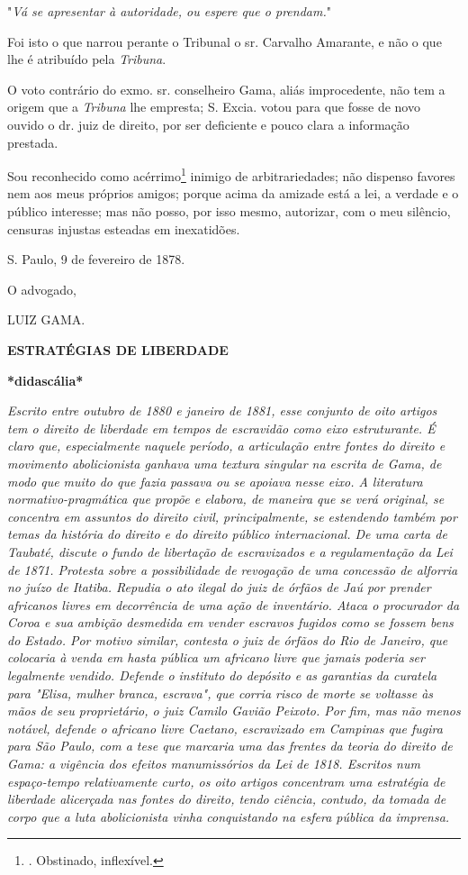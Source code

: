 "\emph{Vá se apresentar à autoridade, ou espere que o prendam.}"

Foi isto o que narrou perante o Tribunal o sr. Carvalho Amarante, e não
o que lhe é atribuído pela \emph{Tribuna}.

O voto contrário do exmo. sr. conselheiro Gama, aliás improcedente, não
tem a origem que a \emph{Tribuna} lhe empresta; S. Excia. votou para que
fosse de novo ouvido o dr. juiz de direito, por ser deficiente e pouco
clara a informação prestada.

Sou reconhecido como acérrimo\footnote{. Obstinado, inflexível.} inimigo
de arbitrariedades; não dispenso favores nem aos meus próprios amigos;
porque acima da amizade está a lei, a verdade e o público interesse; mas
não posso, por isso mesmo, autorizar, com o meu silêncio, censuras
injustas esteadas em inexatidões.

S. Paulo, 9 de fevereiro de 1878.

O advogado,

LUIZ GAMA.

\textbf{ESTRATÉGIAS DE LIBERDADE}

\textbf{*didascália*}

\emph{Escrito entre outubro de 1880 e janeiro de 1881, esse conjunto de
oito artigos tem o direito de liberdade em tempos de escravidão como
eixo estruturante. É claro que, especialmente naquele período, a
articulação entre fontes do direito e movimento abolicionista ganhava
uma textura singular na escrita de Gama, de modo que muito do que fazia
passava ou se apoiava nesse eixo. A literatura normativo-pragmática que
propõe e elabora, de maneira que se verá original, se concentra em
assuntos do direito civil, principalmente, se estendendo também por
temas da história do direito e do direito público internacional. De uma
carta de Taubaté, discute o fundo de libertação de escravizados e a
regulamentação da Lei de 1871. Protesta sobre a possibilidade de
revogação de uma concessão de alforria no juízo de Itatiba. Repudia o
ato ilegal do juiz de órfãos de Jaú por prender africanos livres em
decorrência de uma ação de inventário. Ataca o procurador da Coroa e sua
ambição desmedida em vender escravos fugidos como se fossem bens do
Estado. Por motivo similar, contesta o juiz de órfãos do Rio de Janeiro,
que colocaria à venda em hasta pública um africano livre que jamais
poderia ser legalmente vendido. Defende o instituto do depósito e as
garantias da curatela para "Elisa, mulher branca, escrava", que corria
risco de morte se voltasse às mãos de seu proprietário, o juiz Camilo
Gavião Peixoto. Por fim, mas não menos notável, defende o africano livre
Caetano, escravizado em Campinas que fugira para São Paulo, com a tese
que marcaria uma das frentes da teoria do direito de Gama: a vigência
dos efeitos manumissórios da Lei de 1818. Escritos num espaço-tempo
relativamente curto, os oito artigos concentram uma estratégia de
liberdade alicerçada nas fontes do direito, tendo ciência, contudo, da
tomada de corpo que a luta abolicionista vinha conquistando na esfera
pública da imprensa.}

